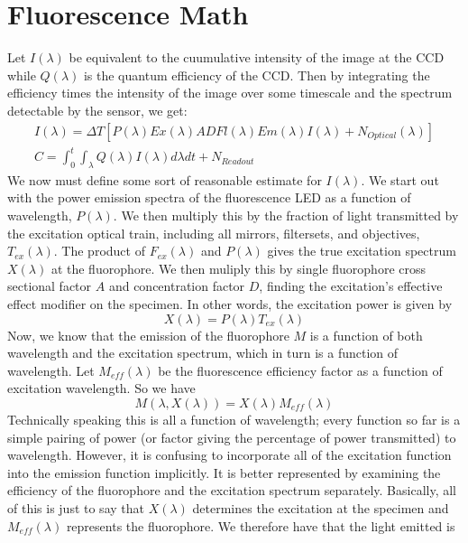 \section{Fluorescence Math}
Let $I(\lambda)$ be equivalent to the cuumulative intensity of the image at the CCD while $Q(\lambda)$ is the quantum efficiency of the CCD. Then by integrating the efficiency times the intensity of the image over some timescale and the spectrum detectable by the sensor, we get:
\begin{gather}
    I(\lambda) = \Delta T [P(\lambda) Ex(\lambda) A D Fl(\lambda) Em(\lambda) I(\lambda) + N_{Optical}(\lambda)]\\
    C = \int_0^t \int_{\lambda} Q(\lambda) I(\lambda) d\lambda dt + N_{Readout}
\end{gather}
We now must define some sort of reasonable estimate for $I(\lambda)$. We start out with the power emission spectra of the fluorescence LED as a function of wavelength, $P(\lambda)$. We then multiply this by the fraction of light transmitted by the excitation optical train, including all mirrors, filtersets, and objectives, $T_{ex}(\lambda)$. The product of $F_{ex}(\lambda)$ and $P(\lambda)$ gives the true excitation spectrum $X(\lambda)$ at the fluorophore. We then muliply this by single fluorophore cross sectional factor $A$ and concentration factor $D$, finding the excitation's effective effect modifier on the specimen. In other words, the excitation power is given by 
\begin{equation}
	X(\lambda) = P(\lambda) T_{ex}(\lambda)
\end{equation}
Now, we know that the emission of the fluorophore $M$ is a function of both wavelength and the excitation spectrum, which in turn is a function of wavelength. Let $M_{eff}(\lambda)$ be the fluorescence efficiency factor as a function of excitation wavelength. So we have 
\begin{equation}
	M(\lambda, X(\lambda))  = X(\lambda) M_{eff}(\lambda) 
\end{equation}
Technically speaking this is all a function of wavelength; every function so far is a simple pairing of power (or factor giving the percentage of power transmitted) to wavelength. However, it is confusing to incorporate all of the excitation function into the emission function implicitly. It is better represented by examining the efficiency of the fluorophore and the excitation spectrum separately. Basically, all of this is just to say that $X(\lambda)$ determines the excitation at the specimen and $M_{eff}(\lambda)$ represents the fluorophore. We therefore have that the light emitted is
